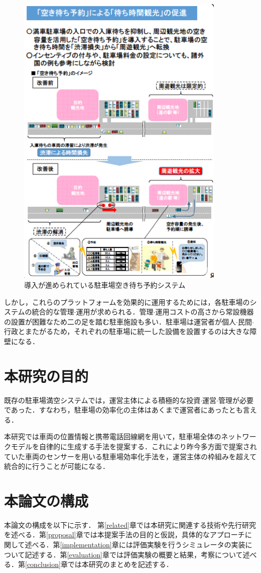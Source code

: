 \begin{figure}
	\centering
	\includegraphics[width=10cm]{fig/kokudo-fig-2.png}
	\caption{導入が進められている駐車場空き待ち予約システム \protect \footnotemark}
	\label{kokudo-fig-2}
\end{figure}
しかし，これらのプラットフォームを効果的に運用するためには，各駐車場のシステムの統合的な管理$\cdot$運用が求められる．管理$\cdot$運用コストの高さから常設機器の設置が困難なため二の足を踏む駐車施設も多い．駐車場は運営者が個人$\cdot$民間$\cdot$行政とまたがるため，それぞれの駐車場に統一した設備を設置するのは大きな障壁になる．




\section{本研究の目的}
既存の駐車場満空システムでは，運営主体による積極的な投資$\cdot$運営$\cdot$管理が必要であった．すなわち，駐車場の効率化の主体はあくまで運営者にあったとも言える．


本研究では車両の位置情報と携帯電話回線網を用いて，駐車場全体のネットワークモデルを自律的に生成する手法を提案する．これにより昨今多方面で提案されていた車両のセンサーを用いる駐車場効率化手法を，運営主体の枠組みを超えて統合的に行うことが可能になる．


\section{本論文の構成}

本論文の構成を以下に示す． 
第\ref{related}章では本研究に関連する技術や先行研究を述べる．第\ref{proposal}章では本提案手法の目的と仮説，具体的なアプローチに関して述べる．第\ref{implementation}章には評価実験を行うシミュレータの実装について記述する．第\ref{evaluation}章では評価実験の概要と結果，考察について述べる．第\ref{conclusion}章では本研究のまとめを記述する．

